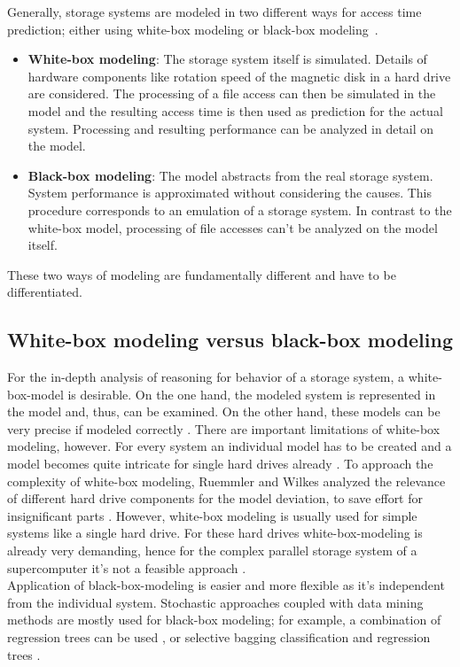 \documentclass{superfri}
\begin{document}
Generally, storage systems are modeled in two different ways for access time prediction; either using white-box modeling or black-box modeling~\cite{Crume:2013:FML:2538542.2538561}.
\begin{itemize}
	\item \textbf{White-box modeling}: The storage system itself is simulated. 
	Details of hardware components like rotation speed of the magnetic disk in a hard drive are considered. 
	The processing of a file access can then be simulated in the model and the resulting access time is then used as prediction for the actual system.
	Processing and resulting performance can be analyzed in detail on the model.
	\item \textbf{Black-box modeling}: The model abstracts from the real storage system. 
	System performance is approximated without considering the causes. %
	This procedure corresponds to an emulation of a storage system.
	In contrast to the white-box model, processing of file accesses can't be analyzed on the model itself.
\end{itemize}
These two ways of modeling are fundamentally different and have to be differentiated.

\subsection{White-box modeling versus black-box modeling}
For the in-depth analysis of reasoning for behavior of a storage system, a white-box-model is desirable.
On the one hand, the modeled system is represented in the model and, thus, can be examined. 
On the other hand, these models can be very precise if modeled correctly \cite{Ruemmler94anintroduction}.
There are important limitations of white-box modeling, however. 
For every system an individual model has to be created and a model becomes quite intricate for single hard drives already \cite{Crume:2013:FML:2538542.2538561}.
To approach the complexity of white-box modeling, Ruemmler and Wilkes analyzed the relevance of different hard drive components for the model deviation, to save effort for insignificant parts \cite{Ruemmler94anintroduction}.
However, white-box modeling is usually used for simple systems like a single hard drive. For these hard drives white-box-modeling is already very demanding, hence for the complex parallel storage system of a supercomputer it's not a feasible approach \cite{DBLP:conf/npc/ZhangLZJC10}.\\

Application of black-box-modeling is easier and more flexible as it's independent from the individual system.
Stochastic approaches coupled with data mining methods are mostly used for black-box modeling; for example, a combination of regression trees can be used \cite{Dai:2012:SDP:2477169.2477214}, or selective bagging classification and regression trees \cite{DBLP:conf/npc/ZhangLZJC10}.
\end{document}
